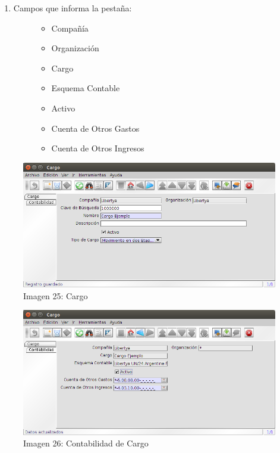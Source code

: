 \documentclass[letterpaper,10pt,spanish]{sphinxmanual}
\begin{document}
\begin{enumerate}
\item {} \begin{description}
\item[{Campos que informa la pestaña:}] \leavevmode\begin{itemize}
\item {} 
Compañía

\item {} 
Organización

\item {} 
Cargo

\item {} 
Esquema Contable

\item {} 
Activo

\item {} 
Cuenta de Otros Gastos

\item {} 
Cuenta de Otros Ingresos

\end{itemize}

\end{description}

\end{enumerate}
\begin{figure}[htbp]
\centering
\capstart

\includegraphics{ly_cargo.png}
\caption{Imagen 25: Cargo}\end{figure}
\begin{figure}[htbp]
\centering
\capstart

\includegraphics{ly_cargo_cont.png}
\caption{Imagen 26: Contabilidad de Cargo}\end{figure}
\end{document}
